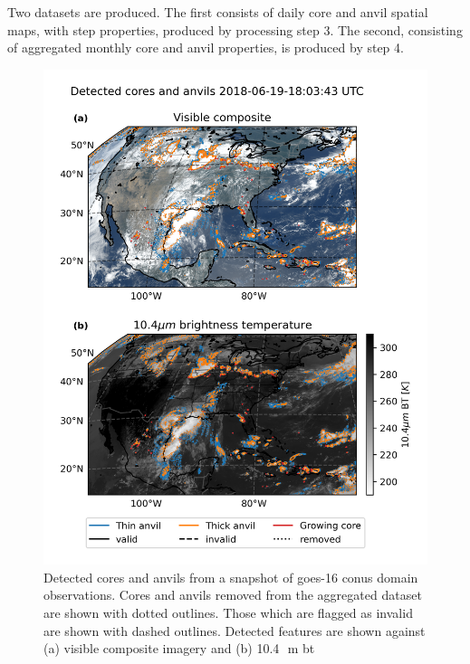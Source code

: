 Two datasets are produced. The first consists of daily core and anvil spatial maps, with step properties, produced by processing step 3. 
The second, consisting of aggregated monthly core and anvil properties, is produced by step 4.

\begin{figure}[tp]
    \centering
    \includegraphics[width=\textwidth]{figures/chapter2_02.png}
    \caption[
    Detected cores and anvils from a snapshot of \acrshort{goes}-16 \acrshort{conus} domain observations
    ]{
    Detected cores and anvils from a snapshot of \acrshort{goes}-16 \acrshort{conus} domain observations. Cores and anvils removed from the aggregated dataset are shown with dotted outlines. Those which are flagged as invalid are shown with dashed outlines. Detected features are shown against (a) visible composite imagery and (b) 10.4\,\unit{\mu m} \acrshort{bt}
    }
    \label{fig:conus_detected_dccs}
\end{figure}

